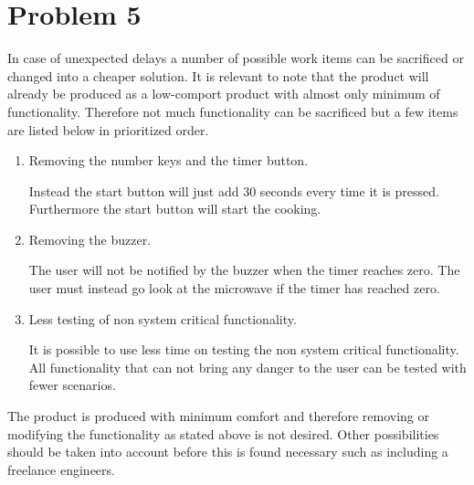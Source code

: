 \chapter{Problem 5}

In case of unexpected delays a number of possible work items can be sacrificed or changed into a cheaper solution. It is relevant to note that the product will already be produced as a low-comport product with almost only minimum of functionality. Therefore not much functionality can be sacrificed but a few items are listed below in prioritized order. 

\begin{enumerate}
\item Removing the number keys and the timer button. 

Instead the start button will just add 30 seconds every time it is pressed. Furthermore the start button will start the cooking.
	
\item Removing the buzzer. 

The user will not be notified by the buzzer when the timer reaches zero. The user must instead go look at the microwave if the timer has reached zero.

\item Less testing of non system critical functionality.

It is possible to use less time on testing the non system critical functionality. All functionality that can not bring any danger to the user can be tested with fewer scenarios.

\end{enumerate}

The product is produced with minimum comfort and therefore removing or modifying the functionality as stated above is not desired. Other possibilities should be taken into account before this is found necessary such as including a freelance engineers.


